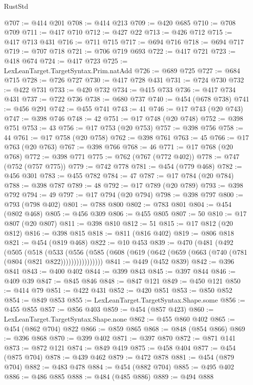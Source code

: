 \begin{lexlean}{RustStd}
\begin{coremodule}
{\begin{coremodule}
{{{{{{{{{{{{{{{{{{{{{{{{{{{{{{{{@707 := @414 @201
@708 := @414 @213
@709 := @420 @685
@710 := @708 @709
@711 := @417 @710
@712 := @427 @22
@713 := @426 @712
@715 := @417 @713 @431
@716 := @711 @715
@717 := @694 @716
@718 := @694 @717
@719 := @707 @718
@721 := @706 @719 @693
@722 := @417 @721
@723 := @418 @674
@724 := @417 @723
@725 := LexLeanTarget.TargetSyntax.Prim.natAdd
@726 := @689 @725
@727 := @684 @715
@728 := @726 @727
@730 := @417 @728 @431
@731 := @724 @730
@732 := @422 @731
@733 := @420 @732
@734 := @415 @733
@736 := @417 @734 @431
@737 := @722 @736
@738 := @680 @737
@740 := @454 (@678 @738)
@741 := @456 @291
@742 := @455 @741
@743 := 41
@746 := @17 @743 (@20 @743)
@747 := @398 @746
@748 := 42
@751 := @17 @748 (@20 @748)
@752 := @398 @751
@753 := 43
@756 := @17 @753 (@20 @753)
@757 := @398 @756
@758 := 44
@761 := @17 @758 (@20 @758)
@762 := @398 @761
@763 := 45
@766 := @17 @763 (@20 @763)
@767 := @398 @766
@768 := 46
@771 := @17 @768 (@20 @768)
@772 := @398 @771
@775 := @762 (@767 (@772 @402))
@778 := @747 (@752 (@757 @775))
@779 := @742 @778
@781 := @454 (@779 @468)
@782 := @456 @301
@783 := @455 @782
@784 := 47
@787 := @17 @784 (@20 @784)
@788 := @398 @787
@789 := 48
@792 := @17 @789 (@20 @789)
@793 := @398 @792
@794 := 49
@797 := @17 @794 (@20 @794)
@798 := @398 @797
@800 := @793 (@798 @402)
@801 := @788 @800
@802 := @783 @801
@804 := @454 (@802 @468)
@805 := @456 @309
@806 := @455 @805
@807 := 50
@810 := @17 @807 (@20 @807)
@811 := @398 @810
@812 := 51
@815 := @17 @812 (@20 @812)
@816 := @398 @815
@818 := @811 (@816 @402)
@819 := @806 @818
@821 := @454 (@819 @468)
@822 := @10 @453
@839 := @470
    (@481
      (@492
        (@505
          (@518
            (@533
              (@556 (@585 (@608 (@619 (@642 (@659 (@663 (@740 (@781 (@804 (@821 @822))))))))))))))))
@841 := @449 (@452 @839)
@842 := @396 @841
@843 := @400 @402
@844 := @399 @843
@845 := @397 @844
@846 := @409 @39
@847 := @845 @846
@848 := @847 @121
@849 := @450 @121
@850 := @414 @79
@851 := @422 @431
@852 := @420 @851
@853 := @850 @852
@854 := @849 @853
@855 := LexLeanTarget.TargetSyntax.Shape.some
@856 := @455 @855
@857 := @856 @403
@859 := @454 (@857 @423)
@860 := LexLeanTarget.TargetSyntax.Shape.none
@862 := @455 @860 @402
@865 := @454 (@862 @704) @822
@866 := @859 @865
@868 := @848 (@854 @866)
@869 := @396 @868
@870 := @399 @402
@871 := @397 @870
@872 := @871 @141
@873 := @872 @121
@874 := @849 @419
@875 := @458 @404
@877 := @454 (@875 @704)
@878 := @439 @462
@879 := @472 @878
@881 := @454 (@879 @704)
@882 := @483 @478
@884 := @454 (@882 @704)
@885 := @495 @402
@886 := @486 @885
@888 := @484 (@485 @886)
@889 := @494 @888
}}}}}}}}}}}}}}}}}}}}}}}}}}}}}}}}
\end{coremodule}}
\end{coremodule}
\end{lexlean}
